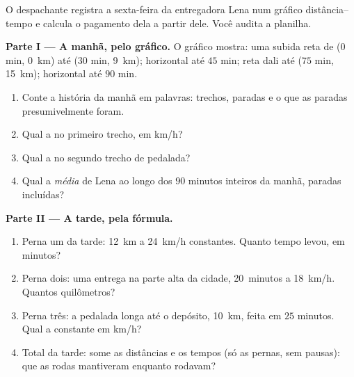 \begin{problem}\label{pb:g7:motion-average-speed:1}
O despachante registra a sexta-feira da entregadora Lena num gráfico
distância--tempo e calcula o pagamento dela a partir dele. Você
audita a planilha.

\medskip\noindent\textbf{Parte I --- A manhã, pelo gráfico.}
O gráfico mostra: uma subida reta de ($0$ min, \qty{0}{km}) até
($30$ min, \qty{9}{km}); horizontal até $45$ min; reta dali até
($75$ min, \qty{15}{km}); horizontal até $90$ min.
\begin{enumerate}
  \item Conte a história da manhã em palavras: trechos, paradas e o
        que as paradas presumivelmente foram.
  \item Qual a  no primeiro trecho, em \unit{km/h}?
  \item Qual a  no segundo trecho de pedalada?
  \item Qual a  \emph{média} de Lena ao longo dos $90$
        minutos inteiros da manhã, paradas incluídas?
\end{enumerate}

\medskip\noindent\textbf{Parte II --- A tarde, pela fórmula.}
\begin{enumerate}[resume]
  \item Perna um da tarde: \qty{12}{km} a \qty{24}{km/h} constantes.
        Quanto tempo levou, em minutos?
  \item Perna dois: uma entrega na parte alta da cidade,
        \qty{20}{minutos} a \qty{18}{km/h}. Quantos quilômetros?
  \item Perna três: a pedalada longa até o depósito, \qty{10}{km},
        feita em $25$ minutos. Qual a  constante em
        \unit{km/h}?
  \item Total da tarde: some as distâncias e os tempos (só as pernas,
        sem pausas): que  as rodas mantiveram
        enquanto rodavam?
\end{enumerate}


\end{problem}

